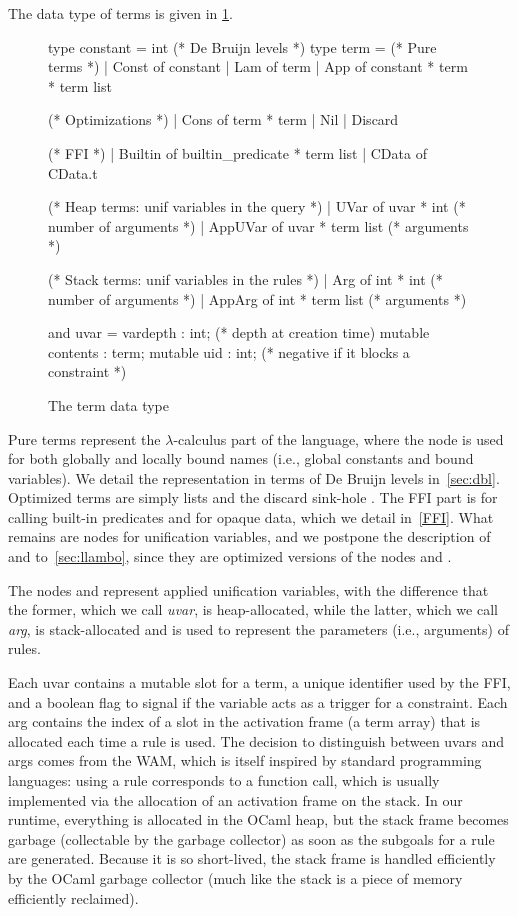 \documentclass[a4paper, 11pt]{book}
\begin{document}
The data type of terms is given in \cref{fig:term}.
\begin{figure}
\begin{ocamlcode}
type constant = int (* De Bruijn levels *)
type term =
  (* Pure terms *)
  | Const of constant
  | Lam of term
  | App of constant * term * term list

  (* Optimizations *)
  | Cons of term * term
  | Nil
  | Discard

  (* FFI *)
  | Builtin of builtin_predicate * term list
  | CData of CData.t

  (* Heap terms: unif variables in the query *)
  | UVar    of uvar * int (* number of arguments *)
  | AppUVar of uvar * term list (* arguments *)

  (* Stack terms: unif variables in the rules *)
  | Arg    of int * int (* number of arguments *)
  | AppArg of int * term list (* arguments *)

and uvar = {
  vardepth : int; (* depth at creation time)
  mutable contents : term;
  mutable uid : int; (* negative if it blocks a constraint *)
}
\end{ocamlcode}
\caption{The term data type\label{fig:term}}
\end{figure}
Pure terms represent the $\lambda$-calculus part of the language, where the
 node is used for both globally and locally bound names (i.e.,
global constants and bound variables). We detail the representation in terms
of De Bruijn levels in~\cref{sec:dbl}. Optimized terms are simply lists and
the discard sink-hole \elpi{_}. The FFI part is for calling built-in
predicates and for opaque data, which we detail in~\cref{FFI}. What remains
are nodes for unification variables, and we postpone the description of
 and  to~\cref{sec:llambo}, since they are optimized
versions of the nodes  and .


The nodes  and  represent applied unification
variables, with the difference that the former, which we call \emph{uvar}, is
heap-allocated, while the latter, which we call \emph{arg}, is stack-allocated
and is used to represent the parameters (i.e., arguments) of rules.


Each uvar contains a mutable slot for a term, a unique identifier used by the
FFI, and a boolean flag to signal if the variable acts as a trigger for a
constraint. Each arg contains the index of a slot in the activation frame (a
term array) that is allocated each time a rule is used. The decision to
distinguish between uvars and args comes from the WAM, which is itself inspired by
standard programming languages: using a rule corresponds to a function call,
which is usually implemented via the allocation of an activation frame on the
stack. In our runtime, everything is allocated in the OCaml heap, but the
stack frame becomes garbage (collectable by the garbage collector) as soon as
the subgoals for a rule are generated. Because it is so short-lived, the stack
frame is handled efficiently by the OCaml garbage collector (much like the
stack is a piece of memory efficiently reclaimed).
\end{document}
